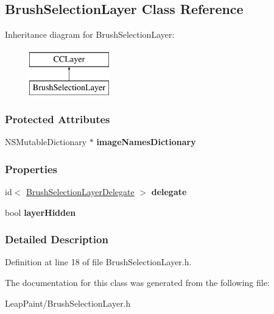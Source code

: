 \hypertarget{interface_brush_selection_layer}{\subsection{Brush\-Selection\-Layer Class Reference}
\label{d5/d83/interface_brush_selection_layer}
}
Inheritance diagram for Brush\-Selection\-Layer\-:\begin{figure}[H]
\begin{center}
\leavevmode
\includegraphics[height=2.000000cm]{d5/d83/interface_brush_selection_layer}
\end{center}
\end{figure}
\subsubsection*{Protected Attributes}
\begin{DoxyCompactItemize}
\item 
\hypertarget{interface_brush_selection_layer_a4ec74d274a54411ce95f3168ee5823ba}{N\-S\-Mutable\-Dictionary $\ast$ {\bfseries image\-Names\-Dictionary}}\label{d5/d83/interface_brush_selection_layer_a4ec74d274a54411ce95f3168ee5823ba}

\end{DoxyCompactItemize}
\subsubsection*{Properties}
\begin{DoxyCompactItemize}
\item 
\hypertarget{interface_brush_selection_layer_a777a4f065988aee06e9a46ccd0ffb10a}{id$<$ \hyperlink{protocol_brush_selection_layer_delegate-p}{Brush\-Selection\-Layer\-Delegate} $>$ {\bfseries delegate}}\label{d5/d83/interface_brush_selection_layer_a777a4f065988aee06e9a46ccd0ffb10a}

\item 
\hypertarget{interface_brush_selection_layer_aaf6677a075014de2c2b0abe254b241a6}{bool {\bfseries layer\-Hidden}}\label{d5/d83/interface_brush_selection_layer_aaf6677a075014de2c2b0abe254b241a6}

\end{DoxyCompactItemize}


\subsubsection{Detailed Description}


Definition at line 18 of file Brush\-Selection\-Layer.\-h.



The documentation for this class was generated from the following file\-:\begin{DoxyCompactItemize}
\item 
Leap\-Paint/Brush\-Selection\-Layer.\-h\end{DoxyCompactItemize}
